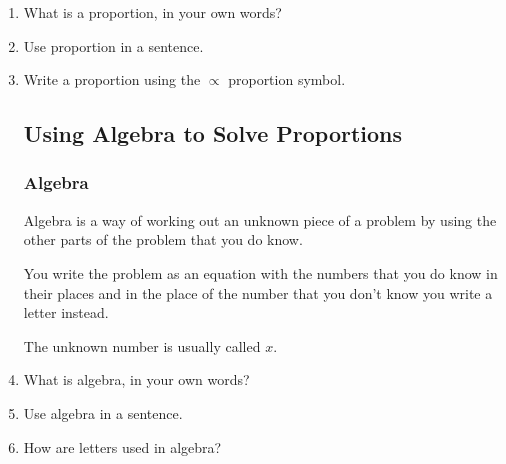 \documentclass{article}
\begin{document}
\begin{spacing}{1.25}
\begin{enumerate}
1 : 2 = 2 : 4 is a proportion.

$\frac{3}{4}=\frac{9}{12}$ is a proportion.

\subsection*{Proportion Symbol $\propto$}

The symbol $\propto$ is used when stating that a proportion exists.

For example, an increase in the temperature of a gas will increase its pressure. The relationship between temperature and pressure is $T \propto P$.

For another example, the relationship between the distance $D$ traveled by a car and the time $T$ it takes to cover that distance at a constant speed $S$ can be expressed as $D \propto S \times T$. As speed increases, the distance traveled in a given time also increases.
    
Proportions are used when scaling things up or down, like maps or designs. They are also used in working out costs, distances, times, speeds, and all sorts of quantities.

\item What is a proportion, in your own words?
\item Use proportion in a sentence.
\item Write a proportion using the $\propto$ proportion symbol.

\subsection*{Using Algebra to Solve Proportions}

\subsubsection*{Algebra}
Algebra is a way of working out an unknown piece of a problem by using the other parts of the problem that you do know.

You write the problem as an equation with the numbers that you do know in their places and in the place of the number that you don't know you write a letter instead.

The unknown number is usually called $x$.

\item What is algebra, in your own words?
\item Use algebra in a sentence.
\item How are letters used in algebra?


\end{enumerate}
\end{spacing}
\end{document}
